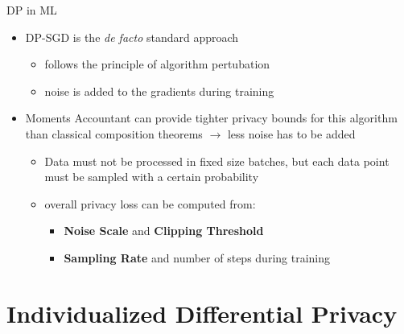 \documentclass[aspectratio=169]{beamer}
\begin{document}
\begin{frame}{DP in ML}
    \begin{itemize}
        \item<1-> DP-SGD \parencite{abadi:2016} is the \textit{de facto} standard approach
        \begin{itemize}
            \item follows the principle of algorithm pertubation
            \item noise is added to the gradients during training 
        \end{itemize}
        \item<2-> Moments Accountant can provide tighter privacy bounds for this algorithm than classical composition theorems $\rightarrow$ less noise has to be added
        \begin{itemize}
            \item Data must not be processed in fixed size batches, but each data point must be sampled with a certain probability
            \item overall privacy loss can be computed from: 
            \begin{itemize}
                \item \textbf{Noise Scale} and \textbf{Clipping Threshold} %
                \item \textbf{Sampling Rate} and number of steps during training
            \end{itemize}
        \end{itemize}
    \end{itemize}
\end{frame}

\section{Individualized Differential Privacy}
\end{document}

